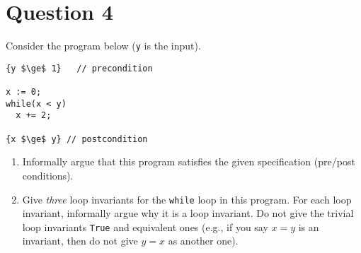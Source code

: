\documentclass[10pt]{article}
\newcommand{\code}[1]{\texttt{#1}}
\begin{document}
\section{Question 4}

Consider the program below (\texttt{y} is the input). 
\begin{lstlisting}
{y $\ge$ 1}   // precondition

x := 0;
while(x < y)
  x += 2;

{x $\ge$ y} // postcondition
\end{lstlisting}


\begin{enumerate}
\item Informally argue that this program satisfies the given specification (pre/post conditions). 

\item Give \emph{three} loop invariants for the \code{while} loop in this program. For each loop invariant, informally argue why it is a loop invariant.  Do not give the trivial loop invariants \code{True} and equivalent ones (e.g., if you say $x = y$ is an invariant, then do not give $y = x$ as another one).


\end{enumerate}
\end{document}

